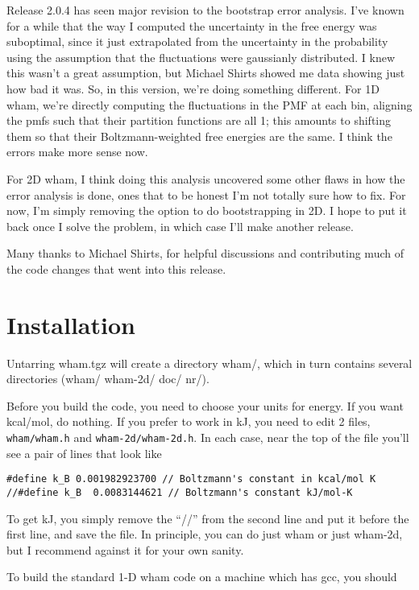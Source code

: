 \documentclass[12pt]{article}
\begin{document}
Release 2.0.4 has seen major revision to the bootstrap error analysis.  
I've known for a while that the way I computed the uncertainty in the free
energy was suboptimal, since it just extrapolated from the uncertainty in the
probability using the assumption that the fluctuations were gaussianly
distributed.  I knew this wasn't a great assumption, but Michael Shirts
showed me data showing just how bad it was.  So, in this version, we're doing
something different.  For 1D wham, we're directly computing the fluctuations
in the PMF at each bin, aligning the pmfs such that their partition functions
are all 1; this amounts to shifting them so that their Boltzmann-weighted
free energies are the same.  I think the errors make more sense now.

For 2D wham, I think doing this analysis uncovered some other flaws in how the
error analysis is done, ones that to be honest I'm not totally sure how to
fix.  For now, I'm simply removing the option to do bootstrapping in 2D.  I
hope to put it back once I solve the problem, in which case I'll make another
release.

Many thanks to Michael Shirts, for helpful discussions and contributing much
of the code changes that went into this release.

\section{Installation}

Untarring wham.tgz will create a directory wham/, which in turn contains
several directories (wham/ wham-2d/ doc/ nr/).   

Before you build the code, you need to choose your units for energy.  If you
want kcal/mol, do nothing.  If you prefer to work in kJ, you need to edit
2 files, {\tt wham/wham.h} and {\tt wham-2d/wham-2d.h}.  In each case, near the
top of the file you'll see a pair of lines that look like 

\begin{verbatim}
#define k_B 0.001982923700 // Boltzmann's constant in kcal/mol K
//#define k_B  0.0083144621 // Boltzmann's constant kJ/mol-K
\end{verbatim}

To get kJ, you simply remove the ``//'' from the second line and put it
before the first line, and save the file.  In principle, you can do just wham
or just wham-2d, but I recommend against it for your own sanity.  

To build the standard 1-D wham code on a machine which has gcc, you should
\end{document}
